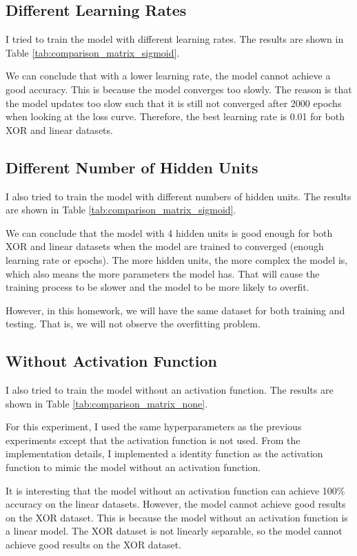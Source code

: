 \subsection{Different Learning Rates}
\label{sec:discussion_learning_rate}

I tried to train the model with different learning rates.
The results are shown in Table \ref{tab:comparison_matrix_sigmoid}.

We can conclude that with a lower learning rate, the model cannot achieve a good accuracy.
This is because the model converges too slowly.
The reason is that the model updates too slow such that it is still not converged after 2000 epochs when looking at the loss curve.
Therefore, the best learning rate is 0.01 for both XOR and linear datasets.

\subsection{Different Number of Hidden Units}

I also tried to train the model with different numbers of hidden units.
The results are shown in Table \ref{tab:comparison_matrix_sigmoid}.

We can conclude that the model with 4 hidden units is good enough for both XOR and linear datasets when the model are trained to converged (enough learning rate or epochs).
The more hidden units, the more complex the model is, which also means the more parameters the model has.
That will cause the training process to be slower and the model to be more likely to overfit.

However, in this homework, we will have the same dataset for both training and testing.
That is, we will not observe the overfitting problem.

\subsection{Without Activation Function}
\label{sec:discussion_without_activation_function}

I also tried to train the model without an activation function.
The results are shown in Table \ref{tab:comparison_matrix_none}.


For this experiment, I used the same hyperparameters as the previous experiments except that the activation function is not used.
From the implementation details, I implemented a identity function as the activation function to mimic the model without an activation function.

It is interesting that the model without an activation function can achieve 100\% accuracy on the linear datasets.
However, the model cannot achieve good results on the XOR dataset.
This is because the model without an activation function is a linear model.
The XOR dataset is not linearly separable, so the model cannot achieve good results on the XOR dataset.


